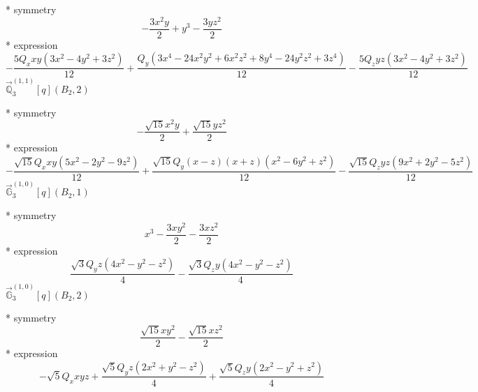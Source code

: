 \documentclass[fleqn,8pt]{jsarticle}
\begin{document}
\noindent\quad ** symmetry
\begin{dmath*}
- \frac{3 x^{2} y}{2} + y^{3} - \frac{3 y z^{2}}{2}
\end{dmath*}
\noindent\quad ** expression
\begin{dmath*}
- \frac{5 Q_{x} x y \left(3 x^{2} - 4 y^{2} + 3 z^{2}\right)}{12} + \frac{Q_{y} \left(3 x^{4} - 24 x^{2} y^{2} + 6 x^{2} z^{2} + 8 y^{4} - 24 y^{2} z^{2} + 3 z^{4}\right)}{12} - \frac{5 Q_{z} y z \left(3 x^{2} - 4 y^{2} + 3 z^{2}\right)}{12}
\end{dmath*}
\noindent\quad $\vec{\mathbb{Q}}_{3}^{(1,1)}[q](B_{2},2)$

\noindent\quad ** symmetry
\begin{dmath*}
- \frac{\sqrt{15} x^{2} y}{2} + \frac{\sqrt{15} y z^{2}}{2}
\end{dmath*}
\noindent\quad ** expression
\begin{dmath*}
- \frac{\sqrt{15} Q_{x} x y \left(5 x^{2} - 2 y^{2} - 9 z^{2}\right)}{12} + \frac{\sqrt{15} Q_{y} \left(x - z\right) \left(x + z\right) \left(x^{2} - 6 y^{2} + z^{2}\right)}{12} - \frac{\sqrt{15} Q_{z} y z \left(9 x^{2} + 2 y^{2} - 5 z^{2}\right)}{12}
\end{dmath*}
\noindent\quad $\vec{\mathbb{G}}_{3}^{(1,0)}[q](B_{2},1)$

\noindent\quad ** symmetry
\begin{dmath*}
x^{3} - \frac{3 x y^{2}}{2} - \frac{3 x z^{2}}{2}
\end{dmath*}
\noindent\quad ** expression
\begin{dmath*}
\frac{\sqrt{3} Q_{y} z \left(4 x^{2} - y^{2} - z^{2}\right)}{4} - \frac{\sqrt{3} Q_{z} y \left(4 x^{2} - y^{2} - z^{2}\right)}{4}
\end{dmath*}
\noindent\quad $\vec{\mathbb{G}}_{3}^{(1,0)}[q](B_{2},2)$

\noindent\quad ** symmetry
\begin{dmath*}
\frac{\sqrt{15} x y^{2}}{2} - \frac{\sqrt{15} x z^{2}}{2}
\end{dmath*}
\noindent\quad ** expression
\begin{dmath*}
- \sqrt{5} Q_{x} x y z + \frac{\sqrt{5} Q_{y} z \left(2 x^{2} + y^{2} - z^{2}\right)}{4} + \frac{\sqrt{5} Q_{z} y \left(2 x^{2} - y^{2} + z^{2}\right)}{4}
\end{dmath*}
\end{document}
